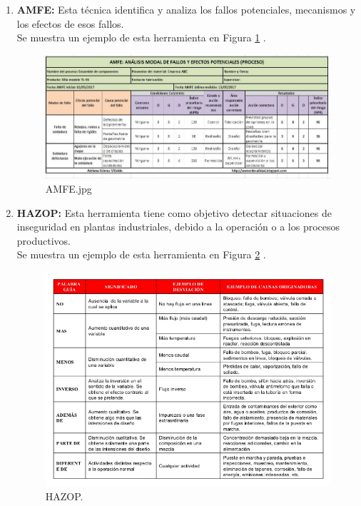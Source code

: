 \begin{enumerate}
\item {\bfseries AMFE:}
Esta técnica identifica y analiza los fallos potenciales, mecanismos y los efectos de esos fallos. \\
Se muestra un ejemplo de esta herramienta en Figura \ref{img:amfe} \cite{amfe}.
\begin{figure}[tphb]
  		   \centering
     		   \includegraphics[width=7in]{AMFE.jpg}
  		   \caption{AMFE.jpg}
  		   \label{img:amfe}
\end{figure}

\item {\bfseries HAZOP:}
Esta herramienta tiene como objetivo detectar situaciones de inseguridad en plantas industriales, debido a la operación o a los procesos productivos.\\
Se muestra un ejemplo de esta herramienta en Figura \ref{img:hazop} \cite{hazop}.
\begin{figure}[tphb]
  		   \centering
     		   \includegraphics[width=6in]{hazop.jpg}
  		   \caption{HAZOP.}
  		   \label{img:hazop}
\end{figure}


\end{enumerate}
